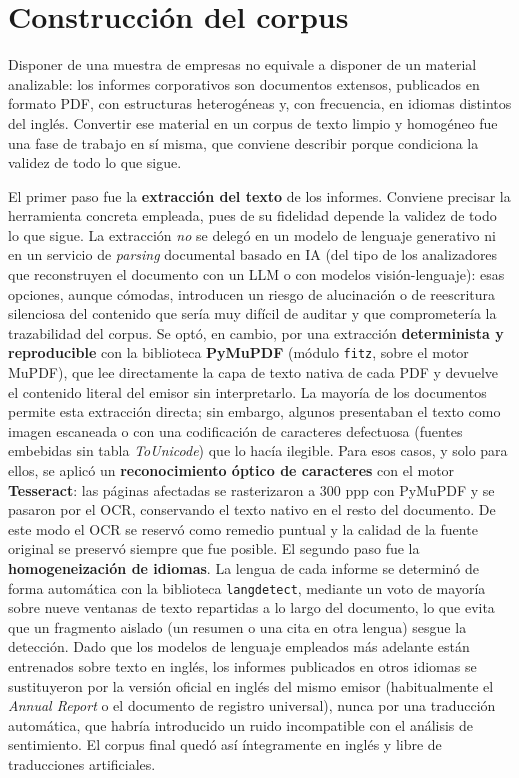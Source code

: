\section{Construcción del corpus}
\label{sec:corpus}

Disponer de una muestra de empresas no equivale a disponer de un material analizable: los
informes corporativos son documentos extensos, publicados en formato PDF, con estructuras
heterogéneas y, con frecuencia, en idiomas distintos del inglés. Convertir ese material en un
corpus de texto limpio y homogéneo fue una fase de trabajo en sí misma, que conviene describir
porque condiciona la validez de todo lo que sigue.

El primer paso fue la \textbf{extracción del texto} de los informes. Conviene precisar la
herramienta concreta empleada, pues de su fidelidad depende la validez de todo lo que sigue.
La extracción \textit{no} se delegó en un modelo de lenguaje generativo ni en un servicio de
\textit{parsing} documental basado en IA (del tipo de los analizadores que reconstruyen el
documento con un LLM o con modelos visión-lenguaje): esas opciones, aunque cómodas, introducen
un riesgo de alucinación o de reescritura silenciosa del contenido que sería muy difícil de
auditar y que comprometería la trazabilidad del corpus. Se optó, en cambio, por una extracción
\textbf{determinista y reproducible} con la biblioteca \textbf{PyMuPDF} (módulo \texttt{fitz},
sobre el motor MuPDF), que lee directamente la capa de texto nativa de cada PDF y devuelve el
contenido literal del emisor sin interpretarlo. La mayoría de los documentos permite esta
extracción directa; sin embargo, algunos presentaban el texto como imagen escaneada o con una
codificación de caracteres defectuosa (fuentes embebidas sin tabla \textit{ToUnicode}) que lo
hacía ilegible. Para esos casos, y solo para ellos, se aplicó un \textbf{reconocimiento óptico
de caracteres} con el motor \textbf{Tesseract}: las páginas afectadas se rasterizaron a 300 ppp
con PyMuPDF y se pasaron por el OCR, conservando el texto nativo en el resto del documento. De
este modo el OCR se reservó como remedio puntual y la calidad de la fuente original se preservó
siempre que fue posible. El segundo paso fue la \textbf{homogeneización de idiomas}. La lengua
de cada informe se determinó de forma automática con la biblioteca \texttt{langdetect}, mediante
un voto de mayoría sobre nueve ventanas de texto repartidas a lo largo del documento, lo que
evita que un fragmento aislado (un resumen o una cita en otra lengua) sesgue la detección. Dado
que los modelos de lenguaje empleados más adelante están entrenados sobre texto en inglés, los
informes publicados en otros idiomas se sustituyeron por la versión oficial en inglés del mismo
emisor (habitualmente el \textit{Annual Report} o el documento de registro universal), nunca por
una traducción automática, que habría introducido un ruido incompatible con el análisis de
sentimiento. El corpus final quedó así íntegramente en inglés y libre de traducciones
artificiales.

